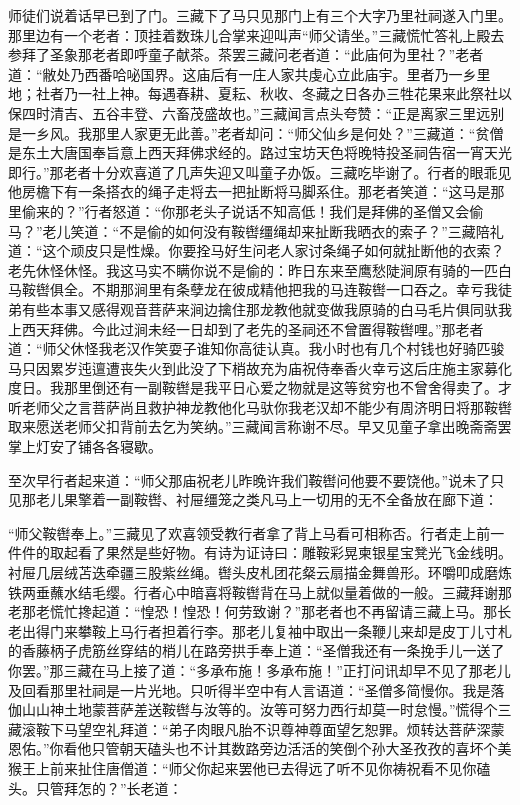 \documentclass[12pt,UTF8]{ctexbook}
\begin{document}
{师徒们说着话早已到了门。三藏下了马只见那门上有三个大字乃里社祠遂入门里。那里边有一个老者：顶挂着数珠儿合掌来迎叫声“师父请坐。”三藏慌忙答礼上殿去参拜了圣象那老者即呼童子献茶。茶罢三藏问老者道：“此庙何为里社？”老者道：“敝处乃西番哈咇国界。这庙后有一庄人家共虔心立此庙宇。里者乃一乡里地；社者乃一社上神。每遇春耕、夏耘、秋收、冬藏之日各办三牲花果来此祭社以保四时清吉、五谷丰登、六畜茂盛故也。”三藏闻言点头夸赞：“正是离家三里远别是一乡风。我那里人家更无此善。”老者却问：“师父仙乡是何处？”三藏道：“贫僧是东土大唐国奉旨意上西天拜佛求经的。路过宝坊天色将晚特投圣祠告宿一宵天光即行。”那老者十分欢喜道了几声失迎又叫童子办饭。三藏吃毕谢了。行者的眼乖见他房檐下有一条搭衣的绳子走将去一把扯断将马脚系住。那老者笑道：“这马是那里偷来的？”行者怒道：“你那老头子说话不知高低！我们是拜佛的圣僧又会偷马？”老儿笑道：“不是偷的如何没有鞍辔缰绳却来扯断我晒衣的索子？”三藏陪礼道：“这个顽皮只是性燥。你要拴马好生问老人家讨条绳子如何就扯断他的衣索？老先休怪休怪。我这马实不瞒你说不是偷的：昨日东来至鹰愁陡涧原有骑的一匹白马鞍辔俱全。不期那涧里有条孽龙在彼成精他把我的马连鞍辔一口吞之。幸亏我徒弟有些本事又感得观音菩萨来涧边擒住那龙教他就变做我原骑的白马毛片俱同驮我上西天拜佛。今此过涧未经一日却到了老先的圣祠还不曾置得鞍辔哩。”那老者道：“师父休怪我老汉作笑耍子谁知你高徒认真。我小时也有几个村钱也好骑匹骏马只因累岁迍邅遭丧失火到此没了下梢故充为庙祝侍奉香火幸亏这后庄施主家募化度日。我那里倒还有一副鞍辔是我平日心爱之物就是这等贫穷也不曾舍得卖了。才听老师父之言菩萨尚且救护神龙教他化马驮你我老汉却不能少有周济明日将那鞍辔取来愿送老师父扣背前去乞为笑纳。”三藏闻言称谢不尽。早又见童子拿出晚斋斋罢掌上灯安了铺各各寝歇。

至次早行者起来道：“师父那庙祝老儿昨晚许我们鞍辔问他要不要饶他。”说未了只见那老儿果擎着一副鞍辔、衬屉缰笼之类凡马上一切用的无不全备放在廊下道：

“师父鞍辔奉上。”三藏见了欢喜领受教行者拿了背上马看可相称否。行者走上前一件件的取起看了果然是些好物。有诗为证诗曰：雕鞍彩晃柬银星宝凳光飞金线明。衬屉几层绒苫迭牵疆三股紫丝绳。辔头皮札团花粲云扇描金舞兽形。环嚼叩成磨炼铁两垂蘸水结毛缨。行者心中暗喜将鞍辔背在马上就似量着做的一般。三藏拜谢那老那老慌忙搀起道：“惶恐！惶恐！何劳致谢？”那老者也不再留请三藏上马。那长老出得门来攀鞍上马行者担着行李。那老儿复袖中取出一条鞭儿来却是皮丁儿寸札的香藤柄子虎筋丝穿结的梢儿在路旁拱手奉上道：“圣僧我还有一条挽手儿一送了你罢。”那三藏在马上接了道：“多承布施！多承布施！”正打问讯却早不见了那老儿及回看那里社祠是一片光地。只听得半空中有人言语道：“圣僧多简慢你。我是落伽山山神土地蒙菩萨差送鞍辔与汝等的。汝等可努力西行却莫一时怠慢。”慌得个三藏滚鞍下马望空礼拜道：“弟子肉眼凡胎不识尊神尊面望乞恕罪。烦转达菩萨深蒙恩佑。”你看他只管朝天磕头也不计其数路旁边活活的笑倒个孙大圣孜孜的喜坏个美猴王上前来扯住唐僧道：“师父你起来罢他已去得远了听不见你祷祝看不见你磕头。只管拜怎的？”长老道：

}
\end{document}
